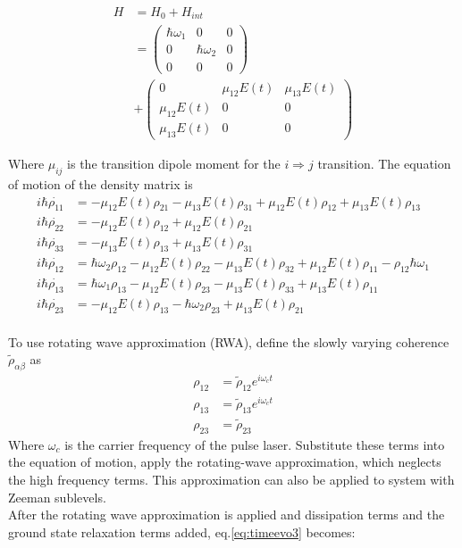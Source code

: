 \documentclass[11pt,a4paper]{article}
\begin{document}
\begin{align}
  H &= H_0+H_{int}\nonumber \\
    &=
\left(
  \begin{array}{ccc}
    \hbar \omega_1 & 0&0\\
    0& \hbar \omega_{2}&0\\
    0&0&0
  \end{array}
\right)\nonumber\\  &+
\left(
  \begin{array}{ccc}
    0& \mu_{12} E(t)&\mu_{13}E(t)\\
    \mu_{12}E(t) &0&0\\
    \mu_{13}E(t)&0&0
  \end{array}
\right)
\end{align}

Where $\mu_{ij}$ is the transition dipole moment for the $i\Rightarrow j$ transition. The equation of motion of the density matrix is
\begin{align}
  \label{eq:timeevo3}
  i \hbar \dot{\rho_{11}} &= -\mu_{12}E(t)\rho_{21}-\mu_{13}E(t)\rho_{31}+\mu_{12}E(t)\rho_{12}+\mu_{13}E(t)\rho_{13}\nonumber\\
  i \hbar \dot{\rho_{22}} &= -\mu_{12}E(t)\rho_{12}+\mu_{12}E(t)\rho_{21}\nonumber\\
  i \hbar \dot{\rho_{33}} &= -\mu_{13}E(t)\rho_{13}+\mu_{13}E(t)\rho_{31}\nonumber\\
  i \hbar \dot{\rho_{12}} &= \hbar\omega_{2}\rho_{12}-\mu_{12}E(t)\rho_{22}-\mu_{13}E(t)\rho_{32}+\mu_{12}E(t)\rho_{11}-\rho_{12}\hbar\omega_{1}\nonumber\\
  i \hbar \dot{\rho_{13}} &= \hbar\omega_1\rho_{13}-\mu_{12}E(t)\rho_{23}-\mu_{13}E(t)\rho_{33}+\mu_{13}E(t)\rho_{11}\nonumber\\
  i \hbar \dot{\rho_{23}} &= -\mu_{12}E(t)\rho_{13}-\hbar\omega_{2}\rho_{23}+\mu_{13}E(t)\rho_{21}\nonumber\\
\end{align}

 To use rotating wave approximation (RWA), define the slowly varying coherence $\tilde{\rho}_{\alpha\beta}$ as
\begin{align*}
  \rho_{12} &= \tilde{\rho}_{12}e^{i\omega_c t}\\
  \rho_{13} &= \tilde{\rho}_{13}e^{i\omega_c t}\\
  \rho_{23} &= \tilde{\rho}_{23}
\end{align*}
Where $\omega_c$ is the carrier frequency of the pulse laser. Substitute these terms into the equation of motion, apply the rotating-wave approximation, which neglects the high frequency terms. This approximation can also be applied to system with Zeeman sublevels.\\
After the rotating wave approximation is applied and dissipation terms and the ground state relaxation terms added, eq.\ref{eq:timeevo3} becomes:
\end{document}
